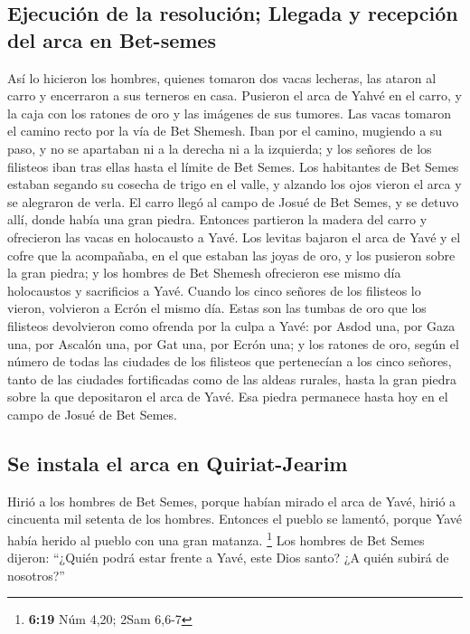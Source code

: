 \begin{paracol}{2}
{\subsection{Ejecución de la resolución; Llegada y recepción del arca en
Bet-semes}\label{ejecuciuxf3n-de-la-resoluciuxf3n-llegada-y-recepciuxf3n-del-arca-en-bet-semes}}

 Así lo hicieron los hombres, quienes tomaron dos vacas
lecheras, las ataron al carro y encerraron a sus terneros en casa.
 Pusieron el arca de Yahvé en el carro, y la caja con los
ratones de oro y las imágenes de sus tumores.  Las vacas
tomaron el camino recto por la vía de Bet Shemesh. Iban por el camino,
mugiendo a su paso, y no se apartaban ni a la derecha ni a la izquierda;
y los señores de los filisteos iban tras ellas hasta el límite de Bet
Semes.  Los habitantes de Bet Semes estaban segando su
cosecha de trigo en el valle, y alzando los ojos vieron el arca y se
alegraron de verla.  El carro llegó al campo de Josué de
Bet Semes, y se detuvo allí, donde había una gran piedra. Entonces
partieron la madera del carro y ofrecieron las vacas en holocausto a
Yavé.  Los levitas bajaron el arca de Yavé y el cofre que
la acompañaba, en el que estaban las joyas de oro, y los pusieron sobre
la gran piedra; y los hombres de Bet Shemesh ofrecieron ese mismo día
holocaustos y sacrificios a Yavé.  Cuando los cinco
señores de los filisteos lo vieron, volvieron a Ecrón el mismo día.
 Estas son las tumbas de oro que los filisteos
devolvieron como ofrenda por la culpa a Yavé: por Asdod una, por Gaza
una, por Ascalón una, por Gat una, por Ecrón una;  y los
ratones de oro, según el número de todas las ciudades de los filisteos
que pertenecían a los cinco señores, tanto de las ciudades fortificadas
como de las aldeas rurales, hasta la gran piedra sobre la que
depositaron el arca de Yavé. Esa piedra permanece hasta hoy en el campo
de Josué de Bet Semes.

\hypertarget{se-instala-el-arca-en-quiriat-jearim}{%
\subsection{Se instala el arca en
Quiriat-Jearim}\label{se-instala-el-arca-en-quiriat-jearim}}

 Hirió a los hombres de Bet Semes, porque habían mirado
el arca de Yavé, hirió a cincuenta mil setenta de los hombres. Entonces
el pueblo se lamentó, porque Yavé había herido al pueblo con una gran
matanza. \footnote{\textbf{6:19} Núm 4,20; 2Sam 6,6-7} 
Los hombres de Bet Semes dijeron: ``¿Quién podrá estar frente a Yavé,
este Dios santo? ¿A quién subirá de nosotros?''


\end{paracol}

